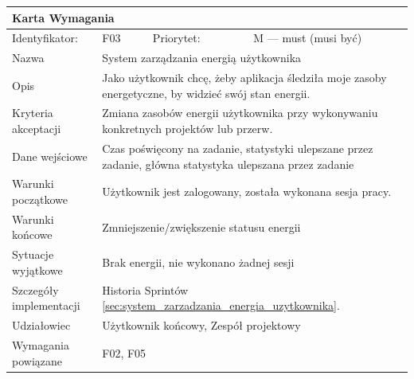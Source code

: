 \documentclass[a4paper,11pt]{report}
\begin{document}
		\begin{tabular}{|p{3cm}|p{2cm}|p{2cm}|p{6cm}|}
		\hline
		\multicolumn{4}{|p{12 cm}|}{Karta Wymagania}\\
		\hline
		Identyfikator: & F03 & Priorytet: & M — must (musi być)\\
		\hline
		Nazwa & \multicolumn{3}{|p{10 cm}|}{System zarządzania energią użytkownika}\\
		\hline
		Opis & \multicolumn{3}{|p{10 cm}|}{Jako użytkownik chcę, żeby aplikacja śledziła moje zasoby energetyczne, by widzieć swój stan energii.}\\
		\hline
		Kryteria akceptacji & \multicolumn{3}{|p{10 cm}|}{Zmiana zasobów energii użytkownika przy wykonywaniu konkretnych projektów lub przerw.}\\
		\hline
		Dane wejściowe & \multicolumn{3}{|p{10 cm}|}{Czas poświęcony na zadanie, statystyki ulepszane przez zadanie, główna statystyka ulepszana przez zadanie}\\
		\hline
		Warunki początkowe & \multicolumn{3}{|p{10 cm}|}{Użytkownik jest zalogowany, została wykonana sesja pracy.}\\
		\hline
		Warunki końcowe & \multicolumn{3}{|p{10 cm}|}{Zmniejszenie/zwiększenie statusu energii}\\
		\hline
		Sytuacje wyjątkowe & \multicolumn{3}{|p{10 cm}|}{Brak energii, nie wykonano żadnej sesji}\\
		\hline
		Szczegóły implementacji & \multicolumn{3}{|p{10 cm}|}{Historia Sprintów \ref{sec:system_zarzadzania_energia_uzytkownika}.}\\
		\hline
		Udziałowiec & \multicolumn{3}{|p{10 cm}|}{Użytkownik końcowy, Zespół projektowy}\\
		\hline
		Wymagania powiązane & \multicolumn{3}{|p{10 cm}|}{F02, F05}\\
		\hline
		\end{tabular}
		\newline
		\vspace*{0,2 cm}
		\newline
\end{document}
